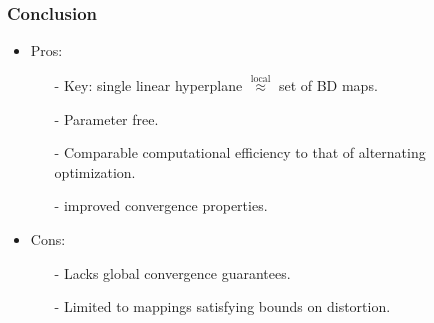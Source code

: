 \documentclass[serif,mathserif]{beamer}
\begin{document}
\begin{frame}
{  
 }
\end{frame}

\begin{frame}
 \frametitle{Conclusion}
 \begin{itemize}
  \item Pros:
    \begin{itemize}
      \item[-] Key: single linear hyperplane $\overset{\text{local}}{\approx}$ set of BD maps.
      \item[-] Parameter free.
      \item[-] Comparable computational efficiency to that of alternating optimization.
      \item[-] improved convergence properties. 
    \end{itemize}
  \item Cons:
    \begin{itemize}
      \item[-] Lacks global convergence guarantees.
      \item[-] Limited to mappings satisfying bounds on distortion.
  \end{itemize}
 \end{itemize}
\end{frame}

\begin{frame} 
\end{frame}
\end{document}
